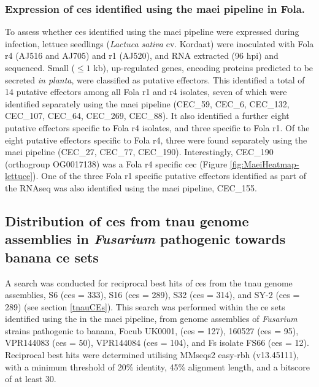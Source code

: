 \subsubsection{Expression of \aclp{ce} identified using the \ac{maei} pipeline in \acl{Fola}.}

To assess whether \acp{ce} identified using the \ac{maei} pipeline were expressed during infection, lettuce seedlings (\textit{Lactuca sativa} cv. Kordaat) were inoculated with \ac{Fola} \ac{r4} (AJ516 and AJ705) and \ac{r1} (AJ520), and RNA extracted (96 \ac{hpi}) and sequenced. Small ($ \leq1$ kb), up-regulated genes, encoding proteins predicted to be secreted \textit{in planta}, were classified as putative effectors. This identified a total of 14 putative effectors among all  \ac{Fola} \ac{r1} and \ac{r4} isolates, seven of which  were identified separately using the \ac{maei} pipeline (CEC\_59, CEC\_6, CEC\_132, CEC\_107, CEC\_64, CEC\_269, CEC\_88). It also  identified a further eight putative effectors specific to \ac{Fola} \ac{r4} isolates, and three specific to \ac{Fola} \ac{r1}. Of the eight putative effectors specific to \ac{Fola} \ac{r4}, three were found separately using the \ac{maei} pipeline (CEC\_27, CEC\_77, CEC\_190). Interestingly, CEC\_190 (orthogroup OG0017138) was a \ac{Fola} \ac{r4} specific \ac{cec} (Figure \ref{fig:MaeiHeatmap-lettuce}). One of the three \ac{Fola} \ac{r1} specific putative effectors identified as part of the RNAseq was also identified using the \ac{maei} pipeline, CEC\_155. 

\subsection{Distribution of \aclp{ce} from \ac{tnau} genome assemblies in \textit{Fusarium} pathogenic towards banana \ac{ce} sets}
\label{sec:Chap3RNASeq}

A search was conducted for reciprocal best hits of \acp{ce} from the \ac{tnau} genome assemblies, S6 (\acp{ce} = 333), S16  (\acp{ce} = 289), S32 (\acp{ce} = 314), and SY-2 (\acp{ce} = 289) (see section \ref{tnauCEs}). This search was performed within the \ac{ce} sets identified using the in the \ac{maei} pipeline, from genome assemblies of \textit{Fusarium} strains pathogenic to banana, \ac{Focub} UK0001, (\acp{ce} = 127), 160527 (\acp{ce} = 95), VPR144083 (\acp{ce} = 50), VPR144084 (\acp{ce} = 104), and \ac{Fs} isolate FS66 (\acp{ce} = 12). Reciprocal best hits were determined utilising MMseqs2 easy-rbh (v13.45111), with a minimum threshold of 20\% identity, 45\% alignment length, and a bitscore of at least 30. 

